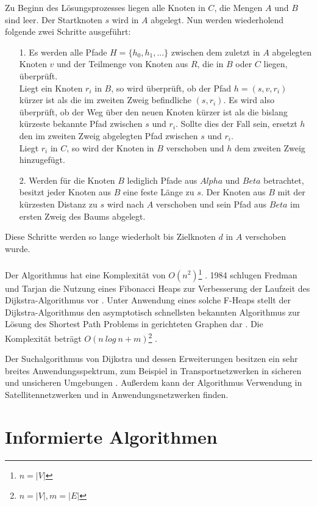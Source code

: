 Zu Beginn des Lösungsprozesses liegen alle Knoten in $C$, die Mengen $A$ und $B$ sind leer. Der Startknoten $s$ wird in $A$ abgelegt. Nun werden wiederholend folgende zwei Schritte ausgeführt:
\begin{itemize}
	\item[1.] Es werden alle Pfade $H = \{h_0, h_1, ...\}$ zwischen dem zuletzt in $A$ abgelegten Knoten $v$ und der Teilmenge von Knoten aus $R$, die in $B$ oder $C$ liegen, überprüft.\\ Liegt ein Knoten $r_i$ in $B$, so wird überprüft, ob der Pfad $h = \left(s, v, r_i\right)$ kürzer ist als die im zweiten Zweig befindliche $\left(s, r_i\right)$. Es wird also überprüft, ob der Weg über den neuen Knoten kürzer ist als die bislang kürzeste bekannte Pfad zwischen $s$ und $r_i$. Sollte dies der Fall sein, ersetzt $h$ den im zweiten Zweig abgelegten Pfad zwischen $s$ und $r_i$. \\Liegt $r_i$ in $C$, so wird der Knoten in $B$ verschoben und $h$ dem zweiten Zweig hinzugefügt.
	\item[2.] Werden für die Knoten $B$ lediglich Pfade aus $Alpha$ und $Beta$ betrachtet, besitzt jeder Knoten aus $B$ eine feste Länge zu $s$. Der Knoten aus $B$ mit der kürzesten Distanz zu $s$ wird nach $A$ verschoben und sein Pfad aus $Beta$ im ersten Zweig des Baums abgelegt.
\end{itemize}
Diese Schritte werden so lange wiederholt bis Zielknoten $d$ in $A$ verschoben wurde. \\ \\	
Der Algorithmus hat eine Komplexität von $O(n^2)$\footnote{$n = |V|$} \cite[S.5]{Madkour.2017}. 1984 schlugen Fredman und Tarjan die Nutzung eines Fibonacci Heaps zur Verbesserung der Laufzeit des Dijkstra-Algorithmus vor \cite{Fredman.1987}. Unter Anwendung eines solche F-Heaps stellt der Dijkstra-Algorithmus den asymptotisch schnellsten bekannten Algorithmus zur Lösung des Shortest Path Problems in gerichteten Graphen dar \cite{Schmitz.2019}.  Die Komplexität beträgt $O(n\ log\ n + m)$\footnote{$n = |V|, m = |E|$} \cite[S.5]{Madkour.2017}.

Der Suchalgorithmus von Dijkstra und dessen Erweiterungen besitzen ein sehr breites Anwendungsspektrum, zum Beispiel in Transportnetzwerken in sicheren \cite{BAN17} und unsicheren Umgebungen \cite{DCZM12}. Außerdem kann der Algorithmus Verwendung in Satellitennetzwerken \cite{HH15} und in Anwendungsnetzwerken \cite{JYA14} finden.

\section{Informierte Algorithmen}

